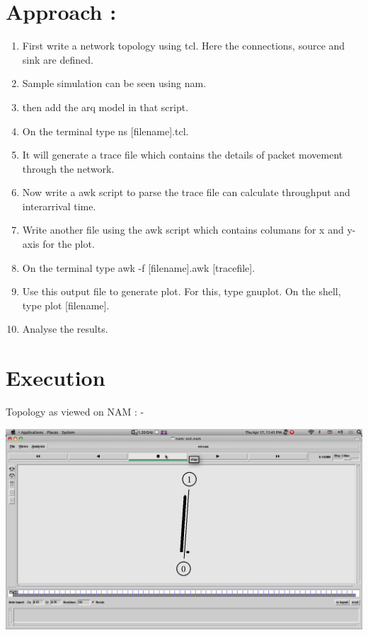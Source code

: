 \documentclass[a4paper,12pt]{article}
\begin{document}
\section{Approach :}

\begin{enumerate}


\item  First write a network topology using tcl. Here the connections, source and sink are defined.
 \item Sample simulation can be seen using nam.
 \item then add the arq model in that script.
 \item On the terminal type ns [filename].tcl.
 \item It will generate a trace file which contains the details of packet movement through the network.
 \item Now write a awk script to parse the trace file can calculate throughput and interarrival time.
 \item Write another file using the awk script which contains columans for x and y-axis for the plot.
 \item On the terminal type awk -f [filename].awk [tracefile].
 \item Use this output file to generate plot. For this, type gnuplot. On the shell, type plot [filename].
 \item Analyse the results.
\end{enumerate}
\newpage
\section{Execution}
Topology as viewed on NAM : -
\begin{center}
 \includegraphics[bb=0 0 1232 493,scale=0.35]{working.png}
\end{center}
\newpage
\end{document}
